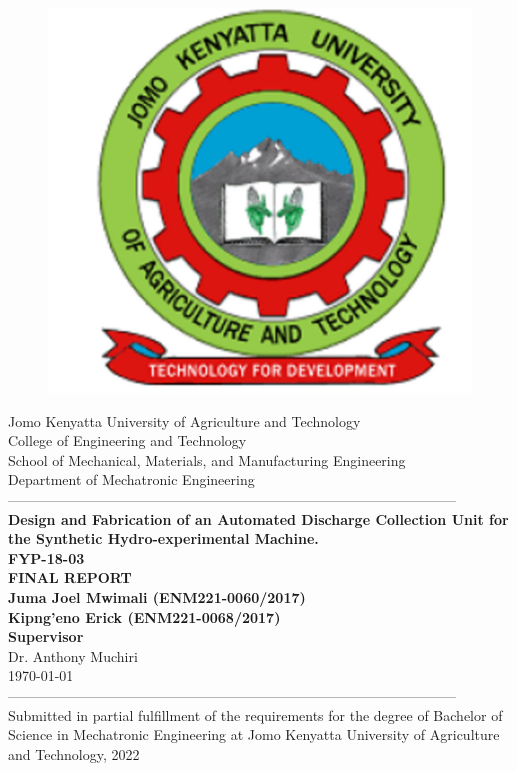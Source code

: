 \documentclass[12pt,fleqn]{article}
\begin{document}
\begin{titlepage}
  \begin{center}
      \vspace*{-4.0cm}
    \begin{figure}[!h]
\centering
\includegraphics[width=0.3\linewidth]{Figures/JKUAT_logo.jpg}
\label{fig:jomologo}
\end{figure}
   \large{Jomo Kenyatta University of Agriculture and Technology}\\
    \large{College of Engineering and Technology}\\
    \large{School of Mechanical, Materials, and Manufacturing Engineering}\\
   \large{Department of Mechatronic Engineering}\\
    ------------------------------------------------------------------------------------------------\\[0.1cm]
    \LARGE{\textbf{Design and Fabrication of an Automated Discharge Collection Unit for the Synthetic Hydro-experimental Machine.}}\\[0.1cm]
    \LARGE{\textbf{FYP-18-03}}\\[0.4cm]
    \LARGE{\textbf{FINAL REPORT}}\\[0.4cm]
    \large{\textbf{Juma Joel Mwimali (ENM221-0060/2017)}}\\[0.2cm]
    \large{\textbf{Kipng'eno Erick  (ENM221-0068/2017)}}\\[0.2cm]
     \large{\textbf{Supervisor}}\\
	\large{Dr. Anthony Muchiri}\\
    \large{\small{\monthyeardate\today}}\\
        ------------------------------------------------------------------------------------------------\\
    \small{Submitted in partial fulfillment of the requirements for the degree of Bachelor of Science in Mechatronic Engineering at Jomo Kenyatta University of Agriculture and Technology, 2022}\\
  \end{center}
\end{titlepage}
\end{document}
